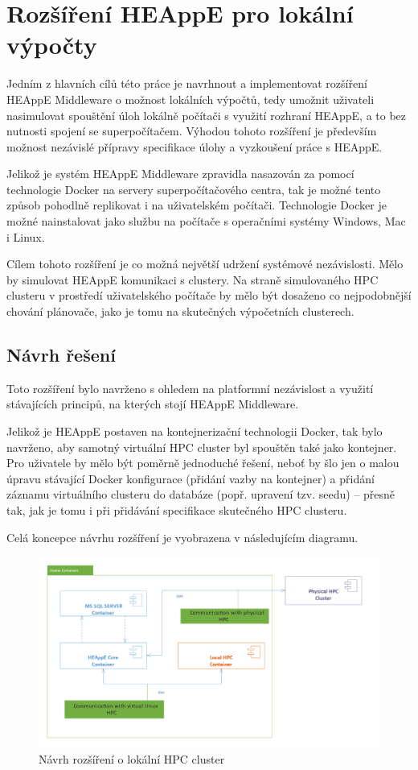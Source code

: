 \chapter{Rozšíření HEAppE pro lokální výpočty}
Jedním z hlavních cílů této práce je navrhnout a implementovat rozšíření HEAppE Middleware o možnost lokálních výpočtů, tedy umožnit uživateli nasimulovat spouštění úloh lokálně počítači s využití rozhraní HEAppE, a to bez nutnosti spojení se superpočítačem. Výhodou tohoto rozšíření je především možnost nezávislé přípravy specifikace úlohy a vyzkoušení práce s HEAppE.

Jelikož je systém HEAppE Middleware zpravidla nasazován za pomocí technologie Docker na servery superpočítačového centra, tak je možné tento způsob pohodlně replikovat i na uživatelském počítači. Technologie Docker je možné nainstalovat jako službu na počítače s operačními systémy Windows, Mac i Linux.

Cílem tohoto rozšíření je co možná největší udržení systémové nezávislosti. Mělo by simulovat HEAppE komunikaci s clustery. Na straně simulovaného HPC clusteru v prostředí uživatelského počítače by mělo být dosaženo co nejpodobnější chování plánovače, jako je tomu na skutečných výpočetních clusterech.

\section{Návrh řešení}
Toto rozšíření bylo navrženo s ohledem na platformní nezávislost a využití stávajících principů, na kterých stojí HEAppE Middleware.

Jelikož je HEAppE postaven na kontejnerizační technologii Docker, tak bylo navrženo, aby samotný virtuální HPC cluster byl spouštěn také jako kontejner. Pro uživatele by mělo být poměrně jednoduché řešení, neboť by šlo jen o malou úpravu stávající Docker konfigurace (přidání vazby na kontejner) a přidání záznamu virtuálního clusteru do databáze (popř. upravení tzv. seedu) – přesně tak, jak je tomu i při přidávání specifikace skutečného HPC clusteru.

Celá koncepce návrhu rozšíření je vyobrazena v následujícím diagramu.

\newpage
\begin{figure}
	\centering
	\includegraphics[width=1.0\textwidth]{Figures/local-hpc-clsuter-navrh.png}
	\caption{Návrh rozšíření o lokální HPC cluster}
	\label{fig:WritingThesis}
\end{figure}

